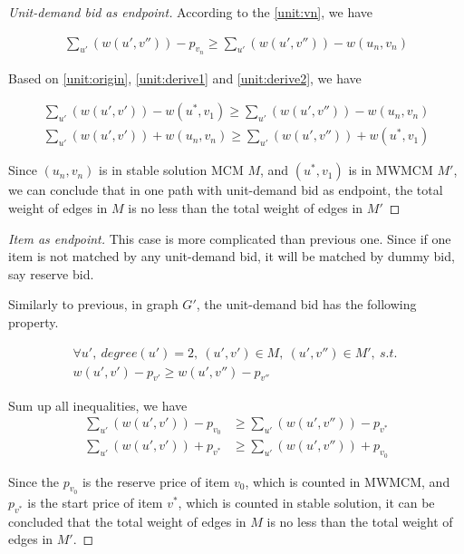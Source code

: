 \documentclass[11pt,a4paper]{article}
\begin{document}
\begin{proof}[Unit-demand bid as endpoint]
    According to the \eqref{unit:vn}, we have 

    \begin{align} \label{unit:derive2}
        \sum_{u'} (w(u', v'')) - p_{v_{n}} \geq \sum_{u'} (w(u', v'')) -
        w(u_{n}, v_{n})
    \end{align}

    Based on \eqref{unit:origin}, \eqref{unit:derive1} and
    \eqref{unit:derive2}, we have

    \begin{align}
        \sum_{u'} (w(u',v')) - w(u^{*}, v_1) \geq \sum_{u'} (w(u', v'')) -
        w(u_{n}, v_{n}) \\
        \sum_{u'} (w(u',v')) +  w(u_{n}, v_{n}) \geq \sum_{u'} (w(u', v'')) +
         w(u^{*}, v_1)
    \end{align}

    Since $(u_n, v_n)$ is in stable solution MCM $M$, and $(u^{*}, v_1)$ is in
    MWMCM $M'$, we can conclude that in one path with unit-demand bid as
    endpoint, the total weight of edges in $M$ is no less than the total
    weight of edges in $M'$

\end{proof}

\begin{proof}[Item as endpoint]

    This case is more complicated than previous one. Since if one item is not matched by
    any unit-demand bid, it will be matched by dummy bid, say reserve bid. 

    Similarly to previous, in graph $G'$, the unit-demand bid has the
    following property.

    \begin{align}
        \forall u',\ degree(u') = 2,\ (u', v') \in M,\ (u', v'') \in M',\
        s.t.\ \nonumber \\
        w(u',v') - p_{v'} \geq w(u', v'') - p_{v''} \label{Item:foreach}
    \end{align}

    Sum up all inequalities, we have 
    \begin{align}
        \sum_{u'}  (w(u',v')) - p_{v_0} &\geq \sum_{u'}  (w(u',v'')) -
        p_{v^{*}} \\
        \sum_{u'}  (w(u',v')) +  p_{v^{*}} &\geq \sum_{u'}  (w(u',v'')) +  p_{v_0} 
    \end{align}

    Since the $p_{v_0}$ is the reserve price of item $v_0$, which is counted
    in MWMCM, and $p_{v^{*}}$ is the start price of item $v^{*}$, which is
    counted in stable solution, it can be concluded that the total weight of
    edges in $M$ is no less than the total weight of edges in $M'$.

\end{proof}
\end{document}
